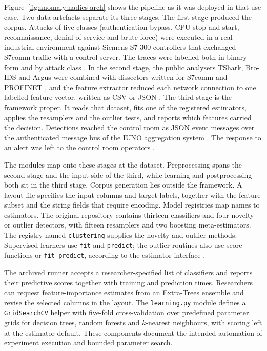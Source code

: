 Figure~\ref{fig:anomaly:nadics-arch} shows the pipeline as it was deployed in that use case. Two
data artefacts separate its three stages. The first stage produced the corpus. Attacks of five
classes (authentication bypass, CPU stop and start, reconnaissance, denial of service and brute
force) were executed in a real industrial environment against Siemens S7-300 controllers that
exchanged S7comm traffic \cite{kleinmann2014accurate} with a control server. The traces were
labelled both in binary form and by attack class \cite{iuno_ap4}. In the second stage, the
public analysers TShark, Bro-IDS and Argus were combined with dissectors written for S7comm and
PROFINET
\cite{akerberg2009exploring}, and the feature extractor reduced each network connection to
one labelled feature vector, written as CSV or JSON
\cite{iuno2017d42,iuno_ap4}. The third stage is the framework proper. It reads that dataset, fits
one of the registered estimators, applies the resamplers and the outlier tests, and reports which
features carried the decision. Detections reached the control room as JSON event messages over
the authenticated message bus of the IUNO aggregation system \cite{iuno_ap4}. The response to
an alert was left to the control room operators \cite{iuno_ap7}.

The modules map onto these stages at the dataset. Preprocessing spans the second stage and the
input side of the third, while learning and postprocessing both sit in the third stage. Corpus
generation lies outside the framework. A layout file specifies the input columns and target
labels, together with the feature subset and the string fields that require encoding. Model
registries map names to estimators. The original repository contains thirteen classifiers and
four novelty or outlier detectors, with fifteen resamplers and two boosting meta-estimators.
The registry named \texttt{clustering} supplies the novelty and outlier methods. Supervised
learners use \texttt{fit} and \texttt{predict}; the outlier routines also use score functions
or \texttt{fit\_predict}, according to the estimator interface \cite{pedregosa2011scikit}.

The archived runner accepts a researcher-specified list of classifiers and reports their
predictive scores together with training and prediction times. Researchers can request
feature-importance estimates from an Extra-Trees ensemble and revise the selected columns in
the layout. The \texttt{learning.py} module defines a \texttt{GridSearchCV} helper with
five-fold cross-validation over predefined parameter grids for decision trees, random forests
and $k$-nearest neighbours, with scoring left at the estimator default. These components
document the intended automation of experiment execution and bounded parameter search.

